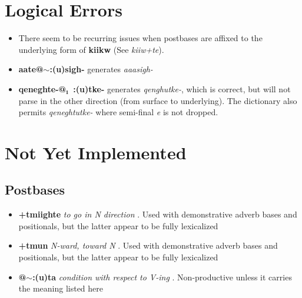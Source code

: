 \documentclass{article}
\begin{document}

\section{Logical Errors}

\begin{itemize}
\renewcommand\labelitemi{$\cdot$}

\item There seem to be recurring issues when postbases are affixed to the underlying form of \textbf{kiikw} (See \textit{kiiw+te}).

\item \textbf{aate@$\sim$:(u)sigh-} generates \textit{aaasigh-}

\item \textbf{qeneghte-@₁~:(u)tke-} generates \textit{qenghutke-}, which is correct, but will not parse in the other direction (from surface to underlying).
%
The dictionary also permits \textit{qeneghtutke-} where semi-final \textit{e} is not dropped.


\end{itemize}



\section{Not Yet Implemented}

\subsection{Postbases}

\begin{itemize}
\renewcommand\labelitemi{$\cdot$}

\item \textbf{+tmiighte} \textit{to go in N direction} . Used with demonstrative adverb bases and positionals, but the latter appear to be fully lexicalized  

\item \textbf{+tmun} \textit{N-ward, toward N} .  Used with demonstrative adverb bases and positionals, but the latter appear to be fully lexicalized  

\item \textbf{@$\sim$:(u)ta} \textit{condition with respect to V-ing} . Non-productive unless it carries the meaning listed here

\end{itemize}
\end{document}
